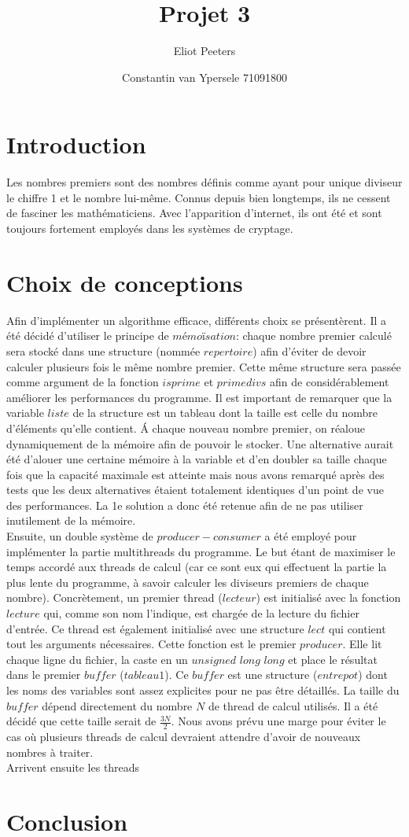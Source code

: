 \documentclass{article}
\title{Projet 3}
\author{Eliot Peeters}
\author{Constantin van Ypersele 71091800}
\begin{document}
\maketitle

\section{Introduction}
Les nombres premiers sont des nombres définis comme ayant pour unique diviseur le chiffre 1 et le nombre lui-même. Connus depuis bien longtemps, ils ne cessent de fasciner les mathématiciens. Avec l'apparition d'internet, ils ont été et sont toujours fortement employés dans les systèmes de cryptage.

\section{Choix de conceptions}
Afin d'implémenter un algorithme efficace, différents choix se présentèrent. Il a été décidé d'utiliser le principe de $mémoïsation$: chaque nombre premier calculé sera stocké dans une structure (nommée $repertoire$) afin d'éviter de devoir calculer plusieurs fois le même nombre premier. Cette même structure sera passée comme argument de la fonction $isprime$ et $primedivs$ afin de considérablement améliorer les performances du programme. Il est important de remarquer que la variable $liste$ de la structure est un tableau dont la taille est celle du nombre d'éléments qu'elle contient. Á chaque nouveau nombre premier, on réaloue dynamiquement de la mémoire afin de pouvoir le stocker. Une alternative aurait été d'alouer une certaine mémoire à la variable et d'en doubler sa taille chaque fois que la capacité maximale est atteinte mais nous avons remarqué après des tests que les deux alternatives étaient totalement identiques d'un point de vue des performances. La 1e solution a donc été retenue afin de ne pas utiliser inutilement de la mémoire. \\
Ensuite, un double système de $producer - consumer$ a été employé pour implémenter la partie multithreads du programme. Le but étant de maximiser le temps accordé aux threads de calcul (car ce sont eux qui effectuent la partie la plus lente du programme, à savoir calculer les diviseurs premiers de chaque nombre). Concrètement, un premier thread ($lecteur$) est initialisé avec la fonction $lecture$ qui, comme son nom l'indique, est chargée de la lecture du fichier d'entrée. Ce thread est également initialisé avec une structure $lect$ qui contient tout les arguments nécessaires. Cette fonction est le premier $producer$. Elle lit chaque ligne du fichier, la caste en un $unsigned$ $long$ $long$ et place le résultat dans le premier $buffer$ ($tableau1$). Ce $buffer$  est une structure ($entrepot$) dont les noms des variables sont assez explicites pour ne pas être détaillés. La taille du $buffer$  dépend directement du nombre $N$ de thread de calcul utilisés. Il a été décidé que cette taille serait de $\frac{3N}{2}$. Nous avons prévu une marge pour éviter le cas où plusieurs threads de calcul devraient attendre d'avoir de nouveaux nombres à traiter. 
\\
Arrivent ensuite les threads

\section{Conclusion}



\end{document}
